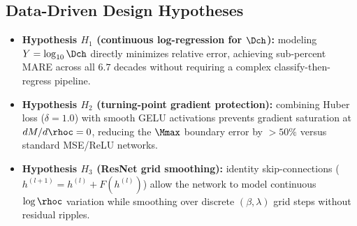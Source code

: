 \subsection{Data-Driven Design Hypotheses}
\label{sec:hypotheses}

\begin{itemize}
  \item \textbf{Hypothesis $H_1$ (continuous log-regression for $\Dch$):} modeling $Y = \log_{10} \Dch$ directly minimizes relative error, achieving sub-percent MARE across all $6.7$ decades without requiring a complex classify-then-regress pipeline.
  \item \textbf{Hypothesis $H_2$ (turning-point gradient protection):} combining Huber loss ($\delta = 1.0$) with smooth GELU activations prevents gradient saturation at $dM/d\rhoc = 0$, reducing the $\Mmax$ boundary error by $>50\%$ versus standard MSE/ReLU networks.
  \item \textbf{Hypothesis $H_3$ (ResNet grid smoothing):} identity skip-connections ($h^{(l+1)} = h^{(l)} + F(h^{(l)})$) allow the network to model continuous $\log\rhoc$ variation while smoothing over discrete $(\beta, \lambda)$ grid steps without residual ripples.
\end{itemize}
